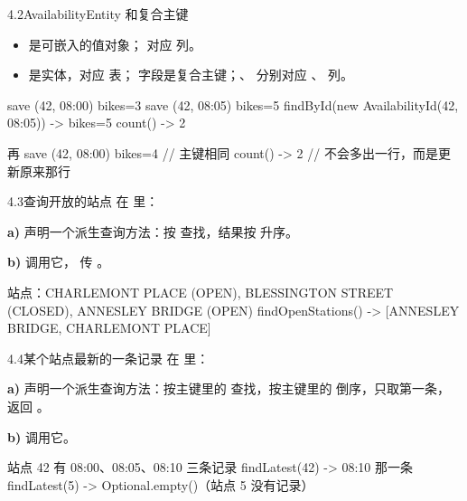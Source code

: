 \begin{task}{4.2\quad AvailabilityEntity 和复合主键}
\begin{itemize}
  \item {} 是可嵌入的值对象； 对应  列。
  \item {} 是实体，对应  表； 字段是复合主键；、 分别对应 、 列。
\end{itemize}

\begin{example}
\begin{plaincode}
save (42, 08:00) bikes=3
save (42, 08:05) bikes=5
findById(new AvailabilityId(42, 08:05))  ->  bikes=5
count()  ->  2

再 save (42, 08:00) bikes=4      // 主键相同
count()  ->  2                   // 不会多出一行，而是更新原来那行
\end{plaincode}
\end{example}
\end{task}

\begin{task}{4.3\quad 查询开放的站点}
在  里：

\textbf{a)} 声明一个派生查询方法：按  查找，结果按  升序。

\textbf{b)}  调用它， 传 。

\begin{example}
\begin{plaincode}
站点：CHARLEMONT PLACE (OPEN), BLESSINGTON STREET (CLOSED), ANNESLEY BRIDGE (OPEN)
findOpenStations()  ->  [ANNESLEY BRIDGE, CHARLEMONT PLACE]
\end{plaincode}
\end{example}
\end{task}

\begin{task}{4.4\quad 某个站点最新的一条记录}
在  里：

\textbf{a)} 声明一个派生查询方法：按主键里的  查找，按主键里的  倒序，只取第一条，返回 。

\textbf{b)}  调用它。

\begin{example}
\begin{plaincode}
站点 42 有 08:00、08:05、08:10 三条记录
findLatest(42)  ->  08:10 那一条
findLatest(5)   ->  Optional.empty()（站点 5 没有记录）
\end{plaincode}
\end{example}
\end{task}

